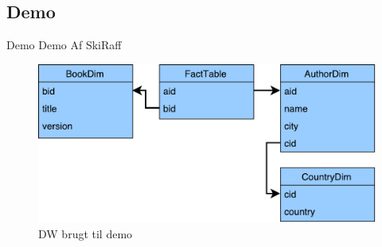\subsection{Demo}

\begin{frame}{Demo}{}
  Demo Af SkiRaff
  \begin{figure}
    \centering
    \includegraphics[width=1\textwidth]{figures/example_dw.pdf}
    \caption{DW brugt til demo}
    \label{demodw}
  \end{figure}
\end{frame}
